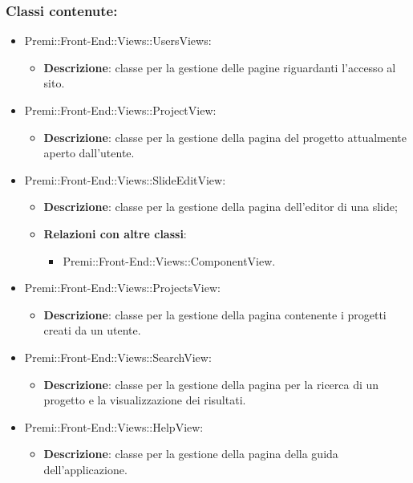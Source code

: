 	\subsubsection*{Classi contenute:}
	\begin{itemize}
		
		\item Premi::Front-End::Views::UsersViews:
		\begin{itemize}
			\item \textbf{Descrizione}: classe per la gestione delle pagine riguardanti l'accesso al sito.
		\end{itemize}
		
		\item Premi::Front-End::Views::ProjectView:
		\begin{itemize}
			\item \textbf{Descrizione}: classe per la gestione della pagina del progetto attualmente aperto dall'utente.
		\end{itemize}
		
		\item Premi::Front-End::Views::SlideEditView:
		\begin{itemize}
			\item \textbf{Descrizione}: classe per la gestione della pagina dell'editor di una slide;
			\item \textbf{Relazioni con altre classi}:
			\begin{itemize}
				\item Premi::Front-End::Views::ComponentView.
			\end{itemize}
		\end{itemize}
		
		\item Premi::Front-End::Views::ProjectsView:
		\begin{itemize}
			\item \textbf{Descrizione}: classe per la gestione della pagina contenente i progetti creati da un utente.
		\end{itemize}
		
		\item Premi::Front-End::Views::SearchView:
		\begin{itemize}
			\item \textbf{Descrizione}: classe per la gestione della pagina per la ricerca di un progetto e la visualizzazione dei risultati.
		\end{itemize}
		
		\item Premi::Front-End::Views::HelpView:
		\begin{itemize}
			\item \textbf{Descrizione}: classe per la gestione della pagina della guida dell'applicazione.
		\end{itemize}
		

\end{itemize}
